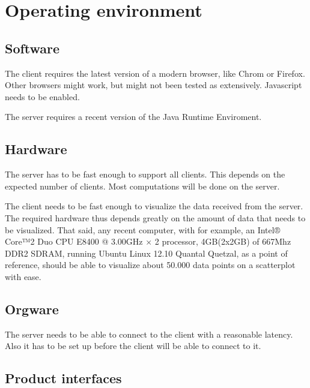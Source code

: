 \section{Operating environment}


\subsection{Software}
The client requires the latest version of a modern browser, like Chrom or Firefox. 
Other browsers might work, but might not been tested as extensively.
Javascript needs to be enabled.

The server requires a recent version of the Java Runtime Enviroment.


\subsection{Hardware}

The server has to be fast enough to support all clients. This depends on
the expected number of clients. Most computations will be done on the server.

The client needs to be fast enough to visualize the data received from the server. 
The required hardware thus depends greatly on the amount of data that needs to be 
visualized. That said, any recent computer, with for example, 
an Intel® Core™2 Duo CPU E8400 @ 3.00GHz × 2 processor, 
4GB(2x2GB) of 667Mhz DDR2 SDRAM, running Ubuntu Linux 12.10 Quantal Quetzal, 
as a point of reference, should be able to visualize about 50.000 
data points on a scatterplot with ease.


\subsection{Orgware}

The server needs to be able to connect to the client with a reasonable latency.
Also it has to be set up before the client will be able to connect to it.

\subsection{Product interfaces}
 
